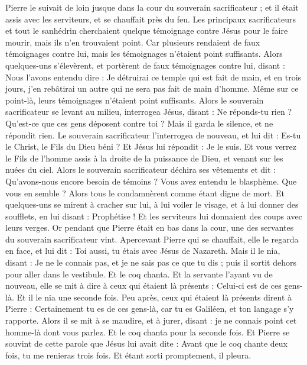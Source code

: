 \begin{multicols}{2}
Pierre le suivait de loin jusque dans la cour du souverain sacrificateur ; et il était assis avec les serviteurs, et se chauffait près du feu.
Les principaux sacrificateurs et tout le sanhédrin cherchaient quelque témoignage contre Jésus pour le faire mourir, mais ils n'en trouvaient point.
Car plusieurs rendaient de faux témoignages contre lui, mais les témoignages n'étaient point suffisants.
Alors quelques-uns s'élevèrent, et portèrent de faux témoignages contre lui, disant :
Nous l'avons entendu dire : Je détruirai ce temple qui est fait de main, et en trois jours, j'en rebâtirai un autre qui ne sera pas fait de main d'homme.
Même sur ce point-là, leurs témoignages n'étaient point suffisants.
Alors le souverain sacrificateur se levant au milieu, interrogea Jésus, disant : Ne réponds-tu rien ? Qu'est-ce que ces gens déposent contre toi ?
Mais il garda le silence, et ne répondit rien. Le souverain sacrificateur l'interrogea de nouveau, et lui dit : Es-tu le Christ, le Fils du Dieu béni ?
Et Jésus lui répondit : Je le suis. Et vous verrez le Fils de l'homme assis à la droite de la puissance de Dieu, et venant sur les nuées du ciel.
Alors le souverain sacrificateur déchira ses vêtements et dit : Qu'avons-nous encore besoin de témoins ?
Vous avez entendu le blasphème. Que vous en semble ? Alors tous le condamnèrent comme étant digne de mort.
Et quelques-uns se mirent à cracher sur lui, à lui voiler le visage, et à lui donner des soufflets, en lui disant : Prophétise ! Et les serviteurs lui donnaient des coups avec leurs verges.
Or pendant que Pierre était en bas dans la cour, une des servantes du souverain sacrificateur vint.
Apercevant Pierre qui se chauffait, elle le regarda en face, et lui dit : Toi aussi, tu étais avec Jésus de Nazareth.
Mais il le nia, disant : Je ne le connais pas, et je ne sais pas ce que tu dis ; puis il sortit dehors pour aller dans le vestibule. Et le coq chanta.
Et la servante l'ayant vu de nouveau, elle se mit à dire à ceux qui étaient là présents : Celui-ci est de ces gens-là. Et il le nia une seconde fois.
Peu après, ceux qui étaient là présents dirent à Pierre : Certainement tu es de ces gens-là, car tu es Galiléen, et ton langage s'y rapporte.
Alors il se mit à se maudire, et à jurer, disant : je ne connais point cet homme-là dont vous parlez.
Et le coq chanta pour la seconde fois. Et Pierre se souvint de cette parole que Jésus lui avait dite : Avant que le coq chante deux fois, tu me renieras trois fois. Et étant sorti promptement, il pleura.

\end{multicols}
